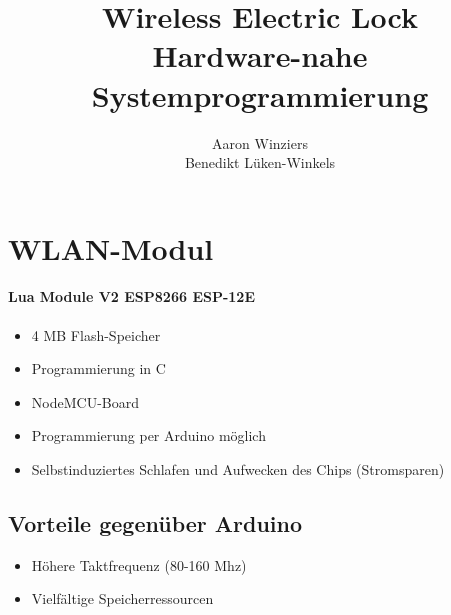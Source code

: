 \documentclass{scrartcl}
\title{Wireless Electric Lock\\ \small{Hardware-nahe Systemprogrammierung}}
\author{Aaron Winziers\\Benedikt Lüken-Winkels}
\begin{document}
%
%

\section{WLAN-Modul}
\paragraph{Lua Module V2 ESP8266 ESP-12E}
\begin{itemize}
\item 4 MB Flash-Speicher
\item Programmierung in C
\item NodeMCU-Board
\item Programmierung per Arduino möglich
\item Selbstinduziertes Schlafen und Aufwecken des Chips (Stromsparen)
\end{itemize}


\subsection{Vorteile gegenüber Arduino}

\begin{itemize}
\item Höhere Taktfrequenz (80-160 Mhz)
\item Vielfältige Speicherressourcen
\end{itemize}




\maketitle
\tableofcontents
\newpage



%
%
\end{document}
